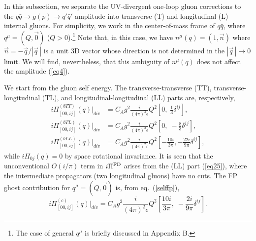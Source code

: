 \documentclass[preprint,amsmath,amssymb,superscriptaddress, floatfix,nofootinbib]{revtex4}
\begin{document}
In this subsection, we separate the UV-divergent one-loop gluon 
corrections to 
the $q\bar{q}\to g(p)\to q'\bar{q}'$ amplitude into transverse (T) and 
longitudinal (L) internal gluons. For simplicity, 
we work in the center-of-mass frame of $q\bar{q}$, 
where $q^{\mu}=(Q,\vec{0})$ ($Q>0$).\footnote{The case of 
general $q^{\mu}$ is briefly discussed in Appendix B.}
Note that, in this case, we have 
$n^{\mu}(q)=(1,\vec{n})$ where $\vec{n}=-\vec{q}/|\vec{q}\,|$ is a 
unit 3D vector whose direction is not determined in the $|\vec{q}\,|\to 0$ limit. 
We will find, nevertheless, that this ambiguity of $n^{\mu}(q)$ 
does not affect the amplitude (\ref{eq4}). 

We start from the gluon self energy. The transverse-transverse (TT), 
transverse-longitudinal (TL), and longitudinal-longitudinal (LL) parts are, respectively,  
%
\begin{subequations}
\begin{align}
i\Pi^{(bTT)}_{[00,ij]}(q)|_{div}  
& = C_A g^2 \frac{i}{(4\pi)^2 \epsilon} Q^2 \left[ 0, \;  
\frac{1}{3}\delta^{ij}  \right] , \label{eq16}
\\
%
i\Pi^{(bTL)}_{[00,ij]}(q)|_{div}  
& = C_A g^2 \frac{i}{(4\pi)^2\epsilon} Q^2 
\left[ 0, \;  -\frac{8}{3}\delta^{ij}  \right] ,  \label{eq21}
\\
%
i\Pi^{(bLL)}_{[00,ij]}(q)|_{div}  
& = C_A g^2 \frac{i}{(4\pi)^2\epsilon}Q^2
\left[ -\frac{10i}{3\pi} , 
 -\frac{22i}{9\pi}  \delta^{ij} 
 \right], \label{eq25}
\end{align}
\end{subequations}
%
while $i\Pi_{0j}(q)=0$ by space rotational invariance. 
It is seen that 
the unconventional $O(i/\pi)$ term in $i\Pi^{\rm FD}$ arises from the (LL) part 
(\ref{eq25}), 
where the intermediate propagators (two longitudinal gluons) have no cuts. 
%
The FP ghost contribution for $q^{\mu}=(Q,\vec{0})$ is, 
from eq.~(\ref{selffp}), 
%
\begin{equation}
i\Pi^{(c)}_{[00, ij]}(q)|_{div}  
=  C_A g^2 \frac{i}{(4\pi)^2\epsilon}Q^2 
\left[   \frac{10i}{3\pi}  ,  \;  
-\frac{2i}{9\pi} \delta^{ij} 
 \right]  . \label{eq28}
\end{equation}
\end{document}
